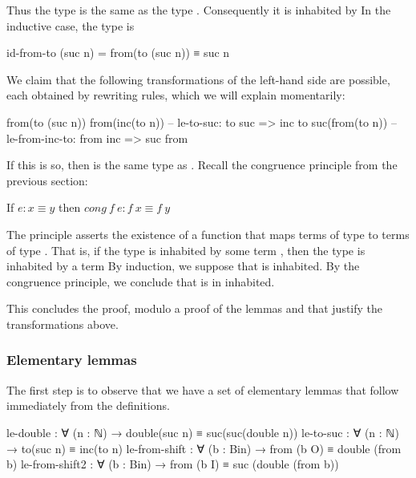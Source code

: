 Thus the type  is the same as the type .  Consequently it is inhabited by  In the inductive case, the type is

\begin{colored}[elm]
id-from-to (suc n) = from(to (suc n)) ≡ suc n
\end{colored}

We claim that the following transformations of the left-hand side are possible, each obtained by rewriting rules, which we will explain momentarily:

\begin{colored}[elm]
from(to (suc n))
from(inc(to n))  -- le-to-suc: to suc => inc to
suc(from(to n))  -- le-from-inc-to: from inc => suc from
\end{colored}

If this is so, then  is the same type as .  Recall the congruence principle from the previous section:

\begin{indent}
If $e : x \equiv y$ then $cong\ f\ e: f\ x \equiv f\ y$
\end{indent}

The principle asserts the existence of a function  that maps terms of type   to terms of type .   That is, if the type   is inhabited by some term , then the type  is inhabited by a term 
By induction, we suppose that  is inhabited.  By the congruence principle, we conclude that  is in inhabited.

This concludes the proof, modulo a proof of the lemmas  and  that justify the transformations above.


\subsubsection{Elementary lemmas}

The first step is to observe that we have a set of elementary lemmas that follow immediately from the definitions.  

\begin{colored}[elm]
le-double : ∀ (n : ℕ) → double(suc n) ≡ suc(suc(double n))
le-to-suc : ∀ (n : ℕ) → to(suc n) ≡ inc(to n)
le-from-shift : ∀ (b : Bin) → from (b O) ≡ double (from b)
le-from-shift2 : ∀ (b : Bin) → from (b I) ≡ suc (double (from b))
\end{colored}

